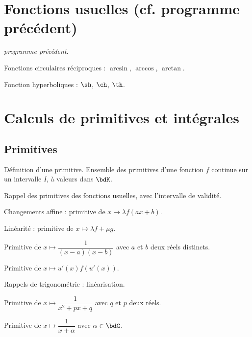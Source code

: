 \documentclass[a4paper,french,bookmarks]{article}
\begin{document}

\section*{Fonctions usuelles (cf. programme précédent)}

\begin{enumerate}
    \ithand \textit{\cf programme précédent}.
    
    \ithand Fonctions circulaires réciproques : $\arcsin$, $\arccos$, $\arctan$.
    
    \ithand Fonction hyperboliques : $\sh$, $\ch$, $\th$.
\end{enumerate}

\section*{Calculs de primitives et intégrales}

\subsection*{Primitives}

\begin{enumerate}
    \ithand Définition d’une primitive. Ensemble des primitives d’une fonction $f$ continue sur un intervalle $I$, à valeurs dans $\bdK$.
    
    \ithand Rappel des primitives des fonctions usuelles, avec l’intervalle de validité.
    
    \ithand Changements affine : primitive de $x \mapsto \lambda f\left(ax + b\right)$.
    
    \ithand Linéarité : primitive de $x \mapsto \lambda f + \mu g$.
    
    \ithand Primitive de $x \mapsto \dfrac{1}{\left(x-a\right)\left(x-b\right)}$ avec $a$ et $b$ deux réels distincts.
    
    \ithand Primitive de $x \mapsto u'\left(x\right)f\left(u'\left(x\right)\right)$.
    
    \ithand Rappels de trigonométrie : linéarisation.
    
    \ithand Primitive de $x \mapsto \dfrac{1}{x^2+px+q}$ avec $q$ et $p$ deux réels.
    
    \ithand Primitive de $x \mapsto \dfrac{1}{x + \alpha}$ avec $\alpha \in \bdC$.
\end{enumerate}
\end{document}
